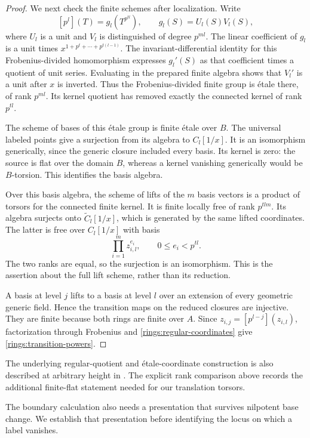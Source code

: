 \begin{proof}
We next check the finite schemes after localization.  Write
\[
 [p^l](T)=g_l(T^{p^{tl}}),\qquad
 g_l(S)=U_l(S)V_l(S),
\]
where $U_l$ is a unit and $V_l$ is distinguished of degree
$p^{ml}$.  The linear coefficient of $g_l$ is a unit times
$x^{1+p^t+\cdots+p^{t(l-1)}}$.  The invariant-differential
identity for this Frobenius-divided homomorphism expresses
$g_l'(S)$ as that coefficient times a quotient of unit series.
Evaluating in the prepared finite algebra shows that $V_l'$ is
a unit after $x$ is inverted.  Thus the Frobenius-divided finite
group is \'etale there, of rank $p^{ml}$.  Its kernel quotient
has removed exactly the connected kernel of rank $p^{tl}$.

The scheme of bases of this \'etale group is finite \'etale over
$B$.  The universal labeled points give a surjection from its
algebra to $C_l[1/x]$.  It is an isomorphism generically, since
the generic closure included every basis.  Its kernel is zero:
the source is flat over the domain $B$, whereas a kernel
vanishing generically would be $B$-torsion.  This identifies the
basis algebra.

Over this basis algebra, the scheme of lifts of the $m$ basis
vectors is a product of torsors for the connected finite kernel.
It is finite locally free of rank $p^{tlm}$.  Its algebra
surjects onto $\widetilde C_l[1/x]$, which is generated by the
same lifted coordinates.  The latter is free over $C_l[1/x]$
with basis
\[
 \prod_{i=1}^m z_{i,l}^{e_i},\qquad 0\leq e_i<p^{tl}.
\]
The two ranks are equal, so the surjection is an isomorphism.
This is the assertion about the full lift scheme, rather than
its reduction.

A basis at level $j$ lifts to a basis at level $l$ over an
extension of every geometric generic field.  Hence the
transition maps on the reduced closures are injective.  They
are finite because both rings are finite over $A$.  Since
$z_{i,j}=[p^{l-j}](z_{i,l})$, factorization through Frobenius
and \eqref{rings:regular-coordinates} give
\eqref{rings:transition-powers}.

\end{proof}

The underlying regular-quotient and \'etale-coordinate
construction is also described at arbitrary height in
\cite[\S\S3--4, Proposition~4.1]{Strauch}.  The explicit
rank comparison above records the additional finite-flat
statement needed for our translation torsors.

The boundary calculation also needs a presentation that survives
nilpotent base change.  We establish that presentation before
identifying the locus on which a label vanishes.

